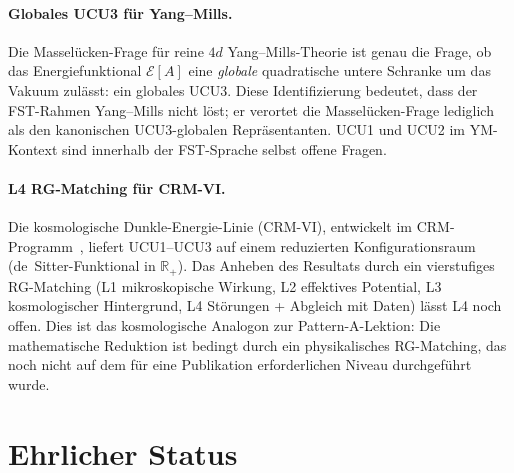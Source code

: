 \documentclass[11pt,a4paper]{article}
\theoremstyle{remark}
\begin{document}
\paragraph{Globales UCU3 für Yang--Mills.}
Die Masselücken-Frage für reine $4d$ Yang--Mills-Theorie ist genau die Frage, ob das Energiefunktional $\mathcal{E}[A]$ eine \emph{globale} quadratische untere Schranke um das Vakuum zulässt: ein globales UCU3. Diese Identifizierung bedeutet, dass der FST-Rahmen Yang--Mills nicht löst; er verortet die Masselücken-Frage lediglich als den kanonischen UCU3-globalen Repräsentanten. UCU1 und UCU2 im YM-Kontext sind innerhalb der FST-Sprache selbst offene Fragen.

\paragraph{L4 RG-Matching für CRM-VI.}
Die kosmologische Dunkle-Energie-Linie (CRM-VI), entwickelt im CRM-Programm~\cite{GeigerCRM2026}, liefert UCU1--UCU3 auf einem reduzierten Konfigurationsraum (de~Sitter-Funktional in $\mathbb{R}_+$). Das Anheben des Resultats durch ein vierstufiges RG-Matching (L1 mikroskopische Wirkung, L2 effektives Potential, L3 kosmologischer Hintergrund, L4 Störungen + Abgleich mit Daten) lässt L4 noch offen. Dies ist das kosmologische Analogon zur Pattern-A-Lektion: Die mathematische Reduktion ist bedingt durch ein physikalisches RG-Matching, das noch nicht auf dem für eine Publikation erforderlichen Niveau durchgeführt wurde.

\section{Ehrlicher Status}
\label{sec:honest-status}
\end{document}
